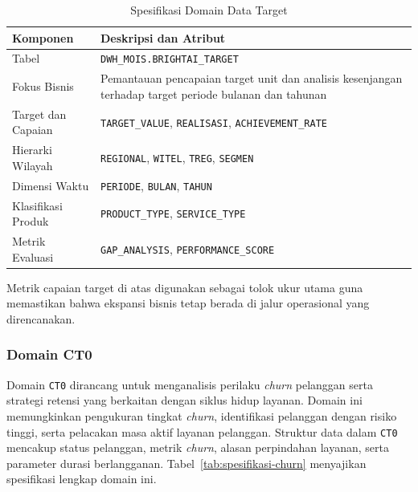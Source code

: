 \begin{table}[htbp]
\centering
\caption{Spesifikasi Domain Data Target}
\label{tab:spesifikasi-target}
\begin{tabular}{|p{4cm}|p{9cm}|}
\hline
\textbf{Komponen} & \textbf{Deskripsi dan Atribut} \\
\hline
Tabel & \texttt{DWH\_MOIS.BRIGHTAI\_TARGET} \\
\hline
Fokus Bisnis & Pemantauan pencapaian target unit dan analisis kesenjangan terhadap target periode bulanan dan tahunan \\
\hline
Target dan Capaian & \texttt{TARGET\_VALUE}, \texttt{REALISASI}, \texttt{ACHIEVEMENT\_RATE} \\
\hline
Hierarki Wilayah & \texttt{REGIONAL}, \texttt{WITEL}, \texttt{TREG}, \texttt{SEGMEN} \\
\hline
Dimensi Waktu & \texttt{PERIODE}, \texttt{BULAN}, \texttt{TAHUN} \\
\hline
Klasifikasi Produk & \texttt{PRODUCT\_TYPE}, \texttt{SERVICE\_TYPE} \\
\hline
Metrik Evaluasi & \texttt{GAP\_ANALYSIS}, \texttt{PERFORMANCE\_SCORE} \\
\hline
\end{tabular}
\end{table}

Metrik capaian target di atas digunakan sebagai tolok ukur utama guna memastikan bahwa ekspansi bisnis tetap berada di jalur operasional yang direncanakan.

\subsubsection{Domain CT0}

Domain \texttt{CT0} dirancang untuk menganalisis perilaku \textit{churn} pelanggan serta strategi retensi yang berkaitan dengan siklus hidup layanan. Domain ini memungkinkan pengukuran tingkat \textit{churn}, identifikasi pelanggan dengan risiko tinggi, serta pelacakan masa aktif layanan pelanggan. Struktur data dalam \texttt{CT0} mencakup status pelanggan, metrik \textit{churn}, alasan perpindahan layanan, serta parameter durasi berlangganan. Tabel~\ref{tab:spesifikasi-churn} menyajikan spesifikasi lengkap domain ini.

